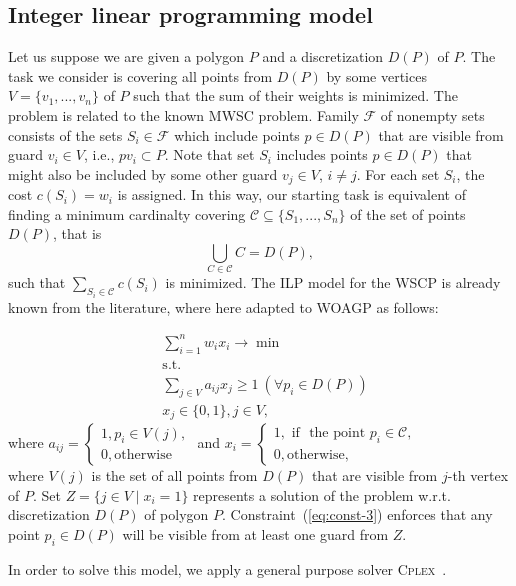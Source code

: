 \documentclass[runningheads,a4paper]{elsarticle}
\begin{document}
	\subsection{Integer linear programming model}
	Let us suppose we are given a polygon $P$ and a discretization $D(P)$ of $P$.  The task we consider is covering all points from $D(P)$ by some vertices $V=\{v_1,...,v_n\}$ of $P$ such that the sum of their weights is minimized.
	The problem is related to the known MWSC problem.
	Family $\mathcal{F}$ of nonempty sets consists of the sets
	$S_i \in \mathcal{F}$ which include points $p \in D(P)$ that are visible from guard $v_i\in V$, i.e., $pv_i \subset P$.  Note that set $S_i$ includes points $p\in D(P)$ that might also be included by some other guard $v_j\in V$, $i \neq j$. For each set $S_i$, the cost $c(S_i) = w_i$ is assigned.  In this way, our starting task is equivalent of finding a minimum cardinalty covering $\mathcal{C}\subseteq\{S_1,...,S_n\}$ of the set of points $D(P)$, that is
	$$ \bigcup_{C \in \mathcal{C}} C = D(P),$$ such that $\sum_{S_i \in \mathcal{C}} c(S_i)$ is minimized.  The ILP  model for the WSCP is already known from the literature, where  here adapted to WOAGP  as follows:

	\begin{align}
	&\sum_{i=1}^n w_ix_i \longrightarrow \min \\
	&\mbox{s.t.} \\
	&\sum_{j\in V} a_{ij}x_j \geq 1\ (\forall p_i\in D(P)) \label{eq:const-3}\\
	& x_j \in \{0,1\}, j \in V,
	\end{align}
	where
	$a_{ij} = \begin{cases}
	1, p_i \in V(j), \\
	0, \mbox{otherwise}
	\end{cases}$
	and $x_i = \begin{cases}
	1, \mbox{ if } \mbox{ the point } p_i \in \mathcal{C},\\
	0, \mbox{otherwise},
	\end{cases}$ \\

	where $V(j)$ is the set of all points from $D(P)$ that are visible from $j$-th vertex of $P$.
	Set $Z = \{j \in V\mid x_i=1\}$ represents a solution of the problem w.r.t. discretization $D(P)$ of polygon $P$.
	Constraint~(\ref{eq:const-3}) enforces that any point $p_i \in D(P)$ will be visible from at least one guard from $Z$. 
	
	In order to solve this model, we apply a general purpose solver \textsc{Cplex}~\cite{lima2010ibm}.
\end{document}

